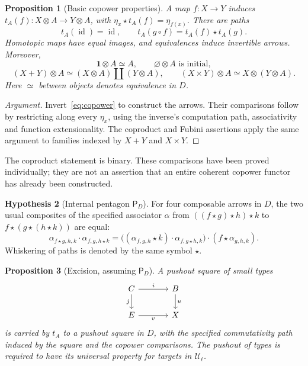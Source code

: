 \documentclass[11pt,a4paper]{amsart}
\newtheorem{proposition}{Proposition}[section]
\theoremstyle{definition}
\newtheorem{hypothesis}[proposition]{Hypothesis}
\newcommand{\id}{\operatorname{id}}
\newcommand{\U}{\mathcal U}
\newcommand{\pt}{\mathbf 1}
\newcommand{\comp}[2]{#1\mathbin{\star}#2}
\newcommand{\PD}{\mathsf P_D}
\begin{document}
\begin{proposition}[Basic copower properties]
A map $f:X\to Y$ induces $t_A(f):X\otimes A\to Y\otimes A$, with
$\comp{\eta_x}{t_A(f)}=\eta_{f(x)}$. There are paths
\[
 t_A(\id)=\id,\qquad
 t_A(g\circ f)=\comp{t_A(f)}{t_A(g)}.
\]
Homotopic maps have equal images, and equivalences induce invertible
arrows. Moreover,
\[
 \pt\otimes A\simeq A,\qquad \varnothing\otimes A\text{ is initial},
\]
\[
 (X+Y)\otimes A\simeq(X\otimes A)\amalg(Y\otimes A),\qquad
 (X\times Y)\otimes A\simeq X\otimes(Y\otimes A).
\]
Here $\simeq$ between objects denotes equivalence in $D$.
\end{proposition}

\begin{proof}[Argument]
Invert~\eqref{eq:copower} to construct the arrows. Their comparisons
follow by restricting along every $\eta_x$, using the inverse's
computation path, associativity and function extensionality. The
coproduct and Fubini assertions apply the same argument to families
indexed by $X+Y$ and $X\times Y$.
\end{proof}

The coproduct statement is binary. These comparisons have been proved
individually; they are not an assertion that an entire coherent
copower functor has already been constructed.

\begin{hypothesis}[Internal pentagon $\PD$]\label{hyp:pent}
For four composable arrows in $D$, the two usual composites of the
specified associator $\alpha$ from
$\comp{(\comp{(\comp f g)}h)}k$ to
$\comp f{(\comp g{(\comp h k)})}$ are equal:
\[
 \alpha_{f\star g,h,k}\cdot\alpha_{f,g,h\star k}
 =\bigl((\alpha_{f,g,h}\star k)\cdot\alpha_{f,g\star h,k}\bigr)
       \cdot(f\star\alpha_{g,h,k}).
\]
Whiskering of paths is denoted by the same symbol $\star$.
\end{hypothesis}

\begin{proposition}[Excision, assuming $\PD$]\label{prop:excision}
A pushout square of small types
\[
 \begin{tikzcd}[column sep=large]
 C\ar[r,"i"]\ar[d,"j"']&B\ar[d,"u"]\\
 E\ar[r,"v"']&X
 \end{tikzcd}
\]
is carried by $t_A$ to a pushout square in $D$, with the specified
commutativity path induced by the square and the copower comparisons.
The pushout of types is required to have its universal property for
targets in $\U_\ell$.
\end{proposition}
\end{document}
